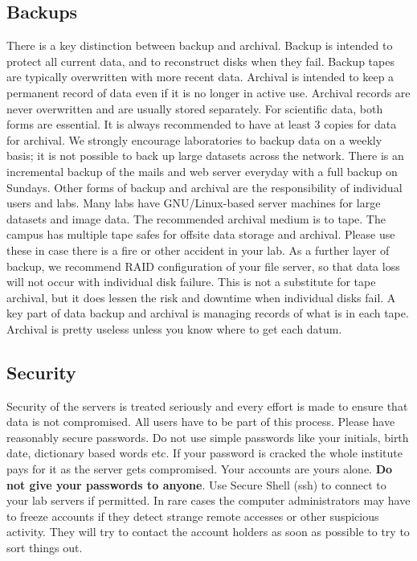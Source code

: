 \documentclass[a4paper]{extarticle}
\begin{document}
\subsection{Backups}
There is a key distinction between backup and archival. Backup is intended to
protect all current data, and to reconstruct disks when they fail. Backup tapes are typically
overwritten with more recent data. Archival is intended to keep a permanent record of data
even if it is no longer in active use. Archival records are never overwritten and are usually
stored separately. For scientific data, both forms are essential. It is always recommended to
have at least 3 copies for data for archival. We strongly encourage laboratories to backup
data on a weekly basis; it is not possible to back up large datasets across the network. There
is an incremental backup of the mails and web server everyday with a full backup on
Sundays. Other forms of backup and archival are the responsibility of individual users and
labs. Many labs have GNU/Linux-based server machines for large datasets and image data.
The recommended archival medium is to tape. The campus has multiple tape safes for
offsite data storage and archival. Please use these in case there is a fire or other accident in
your lab. As a further layer of backup, we recommend RAID configuration of your file
server, so that data loss will not occur with individual disk failure. This is not a substitute for
tape archival, but it does lessen the risk and downtime when individual disks fail. A key part
of data backup and archival is managing records of what is in each tape. Archival is pretty
useless unless you know where to get each datum.

\subsection{Security}
Security of the servers is treated seriously and every effort is made to ensure that
data is not compromised. All users have to be part of this process. Please have reasonably
secure passwords. Do not use simple passwords like your initials, birth date, dictionary
based words etc. If your password is cracked the whole institute pays for it as the server gets
compromised. Your accounts are yours alone. {\bf Do not give your passwords to
anyone}. Use Secure Shell (ssh) to connect to your lab servers if permitted. In rare cases the computer
administrators may have to freeze accounts if they detect strange remote accesses or other
suspicious activity. They will try to contact the account holders as soon as possible to try to
sort things out.
\end{document}
